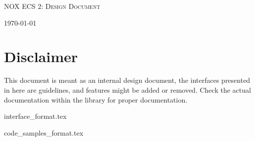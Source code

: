 \documentclass[hidelinks]{article}
\begin{document}
\begin{titlepage}
    \centering
    {\scshape\LARGE NOX ECS 2: Design Document \par}
    \vfill
    {\large \today\par}
\end{titlepage}

\tableofcontents
\pagebreak

\section{Disclaimer}
This document is meant as an internal design document,
the interfaces presented in here are guidelines, and features might be added or removed.
Check the actual documentation within the library for proper documentation.

{interface_format.tex}

\pagebreak



\pagebreak
{code_samples_format.tex}
\end{document}
